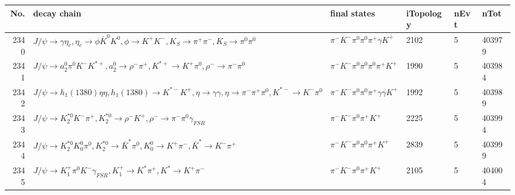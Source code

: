 \begin{table}[htbp] 
\begin{center}
\begin{small}
\begin{tabular}{rlllll}\hline\hline
 No. & decay chain & final states &  iTopology & nEvt & nTot \\\hline
2340&$J/\psi       \rightarrow \gamma       \eta_{c}    , \eta_{c}     \rightarrow \phi           \bar{K}^{0}   K^{0}          , \phi            \rightarrow K^{+}          K^{-}          , K_{S}           \rightarrow \pi^{+}        \pi^{-}        , K_{S}           \rightarrow \pi^{0}        \pi^{0}        $&$\pi^{-}        K^{-}          \pi^{0}        \pi^{0}        \pi^{+}        \gamma       K^{+}          $& 2102&    5&403979\\
2341&$J/\psi       \rightarrow a_{2}^{0}      \pi^{0}        K^{-}          K^{*+}         , a_{2}^{0}       \rightarrow \rho^{-}      \pi^{+}        , K^{*+}          \rightarrow K^{+}          \pi^{0}        , \rho^{-}       \rightarrow \pi^{-}        \pi^{0}        $&$\pi^{-}        K^{-}          \pi^{0}        \pi^{0}        \pi^{0}        \pi^{+}        K^{+}          $& 1990&    5&403984\\
2342&$J/\psi       \rightarrow h_{1}(1380)    \eta          \eta          , h_{1}(1380)     \rightarrow K^{*-}         K^{+}          , \eta           \rightarrow \gamma       \gamma       , \eta           \rightarrow \pi^{-}        \pi^{+}        \pi^{0}        , K^{*-}          \rightarrow K^{-}          \pi^{0}        $&$\pi^{-}        K^{-}          \pi^{0}        \pi^{0}        \pi^{+}        \gamma       \gamma       K^{+}          $& 1992&    5&403989\\
2343&$J/\psi       \rightarrow K_2^{*0}       K^{-}          \pi^{+}        , K_2^{*0}        \rightarrow \rho^{-}      K^{+}          , \rho^{-}       \rightarrow \pi^{-}        \pi^{0}        \gamma_{FSR} $&$\pi^{-}        K^{-}          \pi^{0}        \pi^{+}        K^{+}          $& 2225&    5&403994\\
2344&$J/\psi       \rightarrow K_2^{*0}       K_0^{0}        \pi^{0}        , K_2^{*0}        \rightarrow \bar{K}^{*}   \pi^{0}        , K_0^{0}         \rightarrow K^{+}          \pi^{-}        , \bar{K}^{*}    \rightarrow K^{-}          \pi^{+}        $&$\pi^{-}        K^{-}          \pi^{0}        \pi^{0}        \pi^{+}        K^{+}          $& 2839&    5&403999\\
2345&$J/\psi       \rightarrow K_1^{+}        \pi^{0}        K^{-}          \gamma_{FSR} , K_1^{+}         \rightarrow K^{*}          \pi^{+}        , K^{*}           \rightarrow K^{+}          \pi^{-}        $&$\pi^{-}        K^{-}          \pi^{0}        \pi^{+}        K^{+}          $& 2105&    5&404004\\

\end{tabular}
\end{small}
\end{center}
\end{table}
